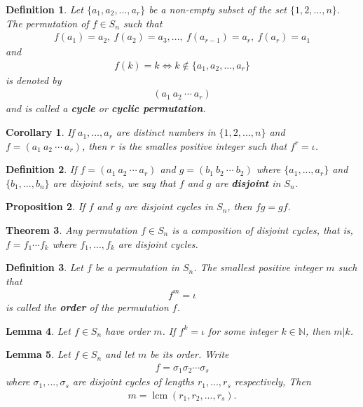\documentclass{article}
\theoremstyle{sltheorem}
\newtheorem{definition}{Definition}[section]
\newtheorem{theorem}{Theorem}[section]
\newtheorem{lemma}[theorem]{Lemma}
\newtheorem{corollary}[theorem]{Corollary}
\newtheorem{proposition}[theorem]{Proposition}
\newcommand{\N}{\mathbb{N}}
\DeclareMathOperator{\lcm}{lcm}
\begin{document}
\begin{definition}
    Let $\{a_1, a_2, ...,a_r\}$ be a non-empty subset of the set $\{1,2,...,n\}$. The permutation of $f\in S_n$ such that
    \begin{align*}
        f(a_1)=a_2,\: f(a_2)=a_3,...,\: f(a_{r-1})=a_r,\: f(a_r)=a_1
    \end{align*}
    and 
    \begin{align*}
        f(k)=k \Leftrightarrow k\not\in \{a_1,a_2,...,a_r\}
    \end{align*}
    is denoted by
    \begin{align*}
        (a_1\:a_2\:\cdots\:a_r)
    \end{align*}
    and is called a \textbf{cycle} or \textbf{cyclic permutation}.
\end{definition}
\begin{corollary}
    If $a_1, ..., a_r$ are distinct numbers in $\{1,2,...,n\}$ and $f=(a_1\: a_2\: \cdots \: a_r)$, then $r$ is the smalles positive integer such that $f^r=\iota$.
\end{corollary}
\begin{definition}
    If $f=(a_1\:a_2\:\cdots\: a_r)$ and $g=(b_1\:b_2\:\cdots\:b_2)$ where $\{a_1,...,a_r\}$ and $\{b_1,..., b_n\}$ are disjoint sets, we say that $f$ and $g$ are \textbf{disjoint} in $S_n$.
\end{definition}
\begin{proposition}
    If $f$ and $g$ are disjoint cycles in $S_n$, then $fg=gf$.    
\end{proposition}
\begin{theorem}
    Any permutation $f\in S_n$ is a composition of disjoint cycles, that is, $f=f_1\cdots f_k$ where $f_1,...,f_k$ are disjoint cycles.
\end{theorem}
\begin{definition}
    Let $f$ be a permutation in $S_n$. The smallest positive integer $m$ such that
    \begin{align*}
        f^m = \iota
    \end{align*}
    is called the \textbf{order} of the permutation $f$.
\end{definition}
\begin{lemma}
    Let $f\in S_n$ have order $m$. If $f^k=\iota$ for some integer $k\in\N$, then $m|k$.
\end{lemma}
\begin{lemma}
    Let $f\in S_n$ and let $m$ be its order. Write
    \begin{align*}
        f=\sigma_1\sigma_2\cdots \sigma_s
    \end{align*}
    where $\sigma_1,...,\sigma_s$ are disjoint cycles of lengths $r_1, ..., r_s$ respectively, Then
    \begin{align*}
        m=\lcm(r_1,r_2,...,r_s).
    \end{align*}
\end{lemma}
\end{document}
